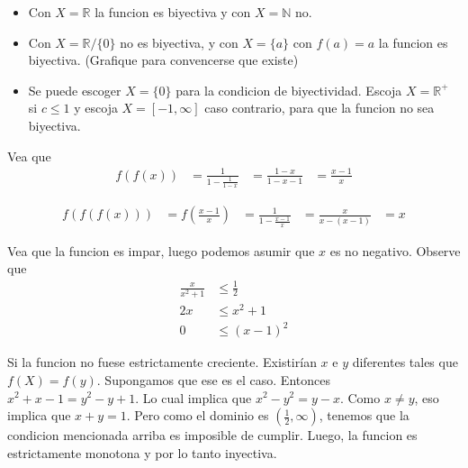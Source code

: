 \begin{sol}
	\begin{itemize}
		\item Con $X = \mathbb{R}$ la funcion es biyectiva y con $X = \mathbb{N}$ no.
		\item Con $X = \mathbb{R} / \{0\}$ no es biyectiva, y con $X = \{a\}$ con $f(a) = a$ la funcion es biyectiva. (Grafique para convencerse que existe)
		\item Se puede escoger $X = \{0\}$ para la condicion de biyectividad. Escoja $X = \mathbb{R}^{+}$ si $c\leq 1$ y escoja $X = [-1, \infty]$ caso contrario, para que la funcion no sea biyectiva.
		
	\end{itemize}
\end{sol}

\begin{sol}
	Vea que
	\begin{equation}
	\begin{aligned}
	f(f(x)) &= \frac{1}{1-\frac{1}{1-x}} 
	&= \frac{1-x}{1-x-1} 
	&= \frac{x-1}{x}
	\end{aligned}
	\end{equation}
	
	\begin{equation}
	\begin{aligned}
	f(f(f(x)) )&= f(\frac{x-1}{x})  
	&= \frac{1}{1-\frac{x-1}{x}} 
	&= \frac{x}{x-(x-1)} 
	&= x
	\end{aligned}
	\end{equation} 
	
\end{sol}


\begin{sol}
	Vea que la funcion es impar, luego podemos asumir que $x$ es no negativo. 
	Observe que 
	\begin{align}
	\frac{x}{x^2+1} &\leq \frac{1}{2}  \\
	2x &\leq x^2 +1  \\
	0 &\leq (x-1)^2 
	\end{align}
\end{sol}

\begin{sol}
	Si la funcion no fuese estrictamente creciente. Existir\'ian $x$ e $y$ diferentes tales que $f(X) = f(y)$. Supongamos que ese es el caso. Entonces $x^2+x-1 = y^2-y+1$. Lo cual implica que $x^2-y^2 = y-x$. Como $x \neq y$, eso implica que $x+y = 1$. Pero como el dominio es $(\frac{1}{2}, \infty)$, tenemos que la condicion mencionada arriba es imposible de cumplir. Luego, la funcion es estrictamente monotona y por lo tanto inyectiva.
\end{sol}

